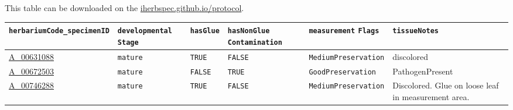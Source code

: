 \documentclass[
  letterpaper,
  DIV=11,
  numbers=noendperiod]{scrreprt}
\begin{document}
This table can be downloaded on the
\href{https://iherbspec.github.io/protocol}{iherbspec.github.io/protocol}.

\begin{longtable}[]{@{}
  >{\raggedright\arraybackslash}p{}
  >{\raggedright\arraybackslash}p{}
  >{\raggedright\arraybackslash}p{}
  >{\raggedright\arraybackslash}p{}
  >{\raggedright\arraybackslash}p{}
  >{\raggedright\arraybackslash}p{}@{}}
\toprule\noalign{}
\begin{minipage}[b]{\linewidth}\raggedright
\texttt{herbariumCode\_specimenID}
\end{minipage} & \begin{minipage}[b]{\linewidth}\raggedright
\texttt{developmental} \texttt{Stage}
\end{minipage} & \begin{minipage}[b]{\linewidth}\raggedright
\texttt{hasGlue}
\end{minipage} & \begin{minipage}[b]{\linewidth}\raggedright
\texttt{hasNonGlue} \texttt{Contamination}
\end{minipage} & \begin{minipage}[b]{\linewidth}\raggedright
\texttt{measurement} \texttt{Flags}
\end{minipage} & \begin{minipage}[b]{\linewidth}\raggedright
\texttt{tissueNotes}
\end{minipage} \\
\midrule\noalign{}
\endhead
\bottomrule\noalign{}
\endlastfoot
\href{https://kiki.huh.harvard.edu/databases/specimen_search.php?mode=details&id=794136}{A\_00631088}
& \texttt{mature} & \texttt{TRUE} & \texttt{FALSE} &
\texttt{MediumPreservation} & discolored \\
\href{https://kiki.huh.harvard.edu/databases/specimen_search.php?mode=details&id=834226}{A\_00672503}
& \texttt{mature} & \texttt{FALSE} & \texttt{TRUE} &
\texttt{GoodPreservation} & PathogenPresent \\
\href{https://kiki.huh.harvard.edu/databases/specimen_search.php?mode=details&id=800877}{A\_00746288}
& \texttt{mature} & \texttt{TRUE} & \texttt{FALSE} &
\texttt{MediumPreservation} & Discolored. Glue on loose leaf in
measurement area. \\

\end{longtable}
\end{document}
